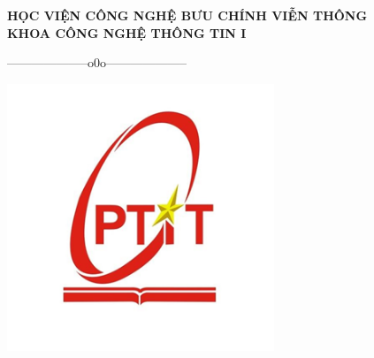 \documentclass[12pt]{report}
\begin{document}
\clearpage
\begin{titlepage}
    \centering
    \textbf{\large HỌC VIỆN CÔNG NGHỆ BƯU CHÍNH VIỄN THÔNG}\\
    \textbf{\Large KHOA CÔNG NGHỆ THÔNG TIN I}\\
    \centerline{--------------------o0o--------------------}  
    \vspace{1cm}
    \includegraphics[width=8cm]{logo.png}\\ %

\end{titlepage}
\end{document}
